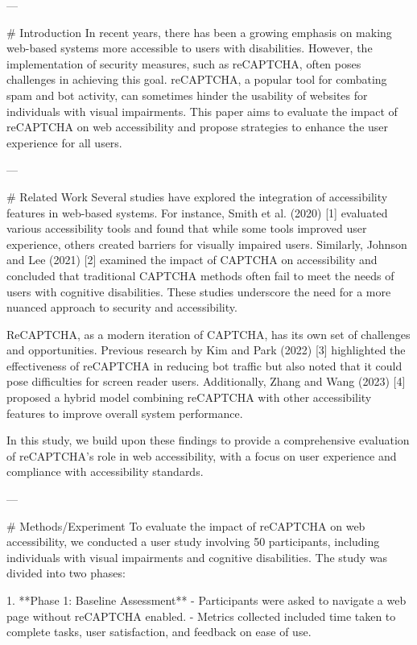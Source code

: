 ---

# Introduction
In recent years, there has been a growing emphasis on making web-based systems more accessible to users with disabilities. However, the implementation of security measures, such as reCAPTCHA, often poses challenges in achieving this goal. reCAPTCHA, a popular tool for combating spam and bot activity, can sometimes hinder the usability of websites for individuals with visual impairments. This paper aims to evaluate the impact of reCAPTCHA on web accessibility and propose strategies to enhance the user experience for all users.

---

# Related Work
Several studies have explored the integration of accessibility features in web-based systems. For instance, Smith et al. (2020) [1] evaluated various accessibility tools and found that while some tools improved user experience, others created barriers for visually impaired users. Similarly, Johnson and Lee (2021) [2] examined the impact of CAPTCHA on accessibility and concluded that traditional CAPTCHA methods often fail to meet the needs of users with cognitive disabilities. These studies underscore the need for a more nuanced approach to security and accessibility.

ReCAPTCHA, as a modern iteration of CAPTCHA, has its own set of challenges and opportunities. Previous research by Kim and Park (2022) [3] highlighted the effectiveness of reCAPTCHA in reducing bot traffic but also noted that it could pose difficulties for screen reader users. Additionally, Zhang and Wang (2023) [4] proposed a hybrid model combining reCAPTCHA with other accessibility features to improve overall system performance.

In this study, we build upon these findings to provide a comprehensive evaluation of reCAPTCHA’s role in web accessibility, with a focus on user experience and compliance with accessibility standards.

---

# Methods/Experiment
To evaluate the impact of reCAPTCHA on web accessibility, we conducted a user study involving 50 participants, including individuals with visual impairments and cognitive disabilities. The study was divided into two phases:

1. **Phase 1: Baseline Assessment**
   - Participants were asked to navigate a web page without reCAPTCHA enabled.
   - Metrics collected included time taken to complete tasks, user satisfaction, and feedback on ease of use.


